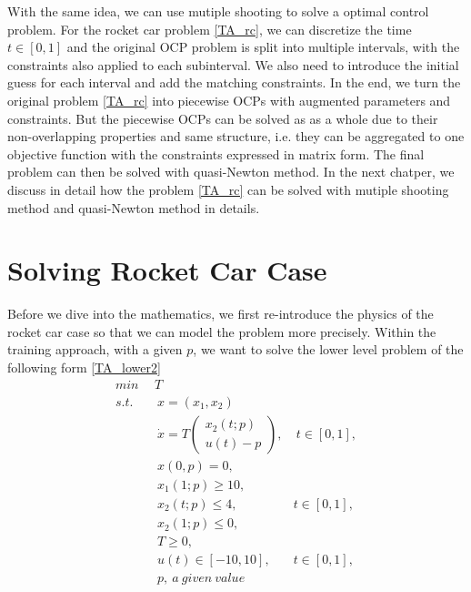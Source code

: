 \documentclass  [
  paper    = a4,
  BCOR     = 10mm,
  twoside,
  fontsize = 12pt,
  fleqn,
  toc      = bibnumbered,
  toc      = listofnumbered,
  numbers  = noendperiod,
  headings = normal,
  listof   = leveldown,
  version  = 3.03
]                                       {scrreprt}
\newcommand{\<}{\langle}
\renewcommand{\>}{\rangle}
\begin{document}
   
   With the same idea, we can use mutiple shooting to solve a optimal control problem. For the rocket car problem \ref{TA_rc}, we can discretize the time $t \in [0, 1]$ and the original OCP problem is split into multiple intervals, with the constraints also applied to each subinterval. We also need to introduce the initial guess for each interval and add the matching constraints. In the end, we turn the original problem  \ref{TA_rc} into piecewise OCPs with augmented parameters and constraints. But the piecewise OCPs can be solved as as a whole due to their non-overlapping properties and same structure, i.e. they can be aggregated to one objective function with the constraints expressed in matrix form. The final problem can then be solved with quasi-Newton method. In the next chatper, we discuss in detail how the problem \ref{TA_rc} can be solved with mutiple shooting method and quasi-Newton method in details. 
   
   
   \chapter{Solving Rocket Car Case}
   Before we dive into the mathematics, we first re-introduce the physics of the rocket car case so that we can model the problem more precisely. Within the training approach, with a given $p$, we want to solve the lower level problem of the following form \ref{TA_lower2}
   \begin{subequations}
   	\begin{align}
   	\underset{}{min} \   & \  T \\ 
   	s.t.  & \ \ x = (x_1, x_2)   \label{ta_rc_x} \\ 
   	& \ \  \dot{x} = T  \begin{pmatrix}  x_2(t;p) \\ u(t)-p   \end{pmatrix}, & \ t \in [0,1],  \label{ta_rc_partial2} \\
   	& \ \ x(0,p) = 0, \label{ta_rc_t2}\\
   	& \ \ x_1(1;p) \geq 10, \label{ta_rc_x1_t2} \\
   	& \ \ x_2(t;p) \leq 4, & t \in [0,1], \label{ta_rc_x2_tc2} \\
   	& \ \ x_2(1;p) \leq 0, \label{ta_rc_x2_t1_2}  \\
   	& \ \ T \geq 0, \\
   	& \ \ u(t) \in [-10, 10], & t \in [0,1], \\
   	& \ \ p, \   a \ given \ value
   	\end{align}
   	\label{TA_lower2}
   \end{subequations}
   
\end{document}
